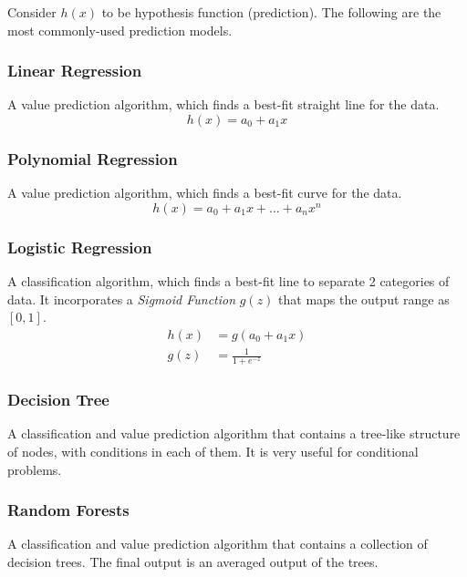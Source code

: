 \documentclass[
  english,
  doc,floatsintext]{apa6}
\begin{document}
Consider \(h(x)\) to be hypothesis function (prediction). The following are the most commonly-used prediction models.

\hypertarget{linear-regression}{%
\subsubsection{Linear Regression}\label{linear-regression}}

A value prediction algorithm, which finds a best-fit straight line for the data.
\[
h(x) = a_0 + a_1 x
\]

\hypertarget{polynomial-regression}{%
\subsubsection{Polynomial Regression}\label{polynomial-regression}}

A value prediction algorithm, which finds a best-fit curve for the data.
\[
h(x) = a_0 + a_1 x + \dots + a_n x^n
\]

\hypertarget{logistic-regression}{%
\subsubsection{Logistic Regression}\label{logistic-regression}}

A classification algorithm, which finds a best-fit line to separate 2 categories of data. It incorporates a \emph{Sigmoid Function} \(g(z)\) that maps the output range as \([0, 1]\).
\[
\begin{aligned}
h(x) &= g(a_0 + a_1 x) \\
g(z) &= \frac1{ 1+e^{-z} }
\end{aligned}
\]

\hypertarget{decision-tree}{%
\subsubsection{Decision Tree}\label{decision-tree}}

A classification and value prediction algorithm that contains a tree-like structure of nodes, with conditions in each of them. It is very useful for conditional problems.

\hypertarget{random-forests}{%
\subsubsection{Random Forests}\label{random-forests}}

A classification and value prediction algorithm that contains a collection of decision trees. The final output is an averaged output of the trees.
\end{document}
